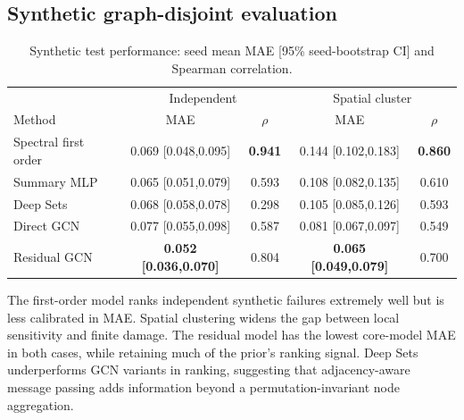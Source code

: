 \documentclass[11pt]{amsart}
\begin{document}
\subsection{Synthetic graph-disjoint evaluation}
\begin{table}[H]
\centering
\caption{Synthetic test performance: seed mean MAE [95\% seed-bootstrap CI]
and Spearman correlation.}
\label{tab:synthetic}
\small
\begin{tabular}{lcc|cc}
\toprule &\multicolumn{2}{c|}{Independent}&\multicolumn{2}{c}{Spatial cluster}\\
Method&MAE&$\rho$&MAE&$\rho$\\ \midrule
Spectral first order&0.069 [0.048,0.095]&\textbf{0.941}&0.144 [0.102,0.183]&\textbf{0.860}\\
Summary MLP&0.065 [0.051,0.079]&0.593&0.108 [0.082,0.135]&0.610\\
Deep Sets&0.068 [0.058,0.078]&0.298&0.105 [0.085,0.126]&0.593\\
Direct GCN&0.077 [0.055,0.098]&0.587&0.081 [0.067,0.097]&0.549\\
Residual GCN&\textbf{0.052 [0.036,0.070]}&0.804&\textbf{0.065 [0.049,0.079]}&0.700\\
\bottomrule
\end{tabular}
\end{table}

The first-order model ranks independent synthetic failures extremely well but
is less calibrated in MAE. Spatial clustering widens the gap between local
sensitivity and finite damage. The residual model has the lowest core-model MAE
in both cases, while retaining much of the prior's ranking signal. Deep Sets
underperforms GCN variants in ranking, suggesting that adjacency-aware message
passing adds information beyond a permutation-invariant node aggregation.
\end{document}
